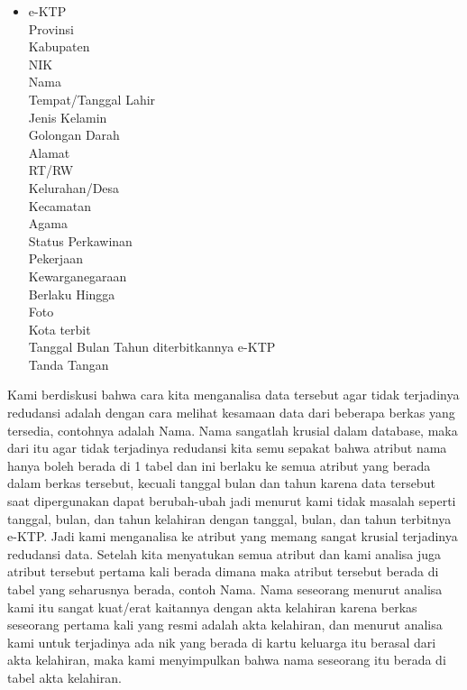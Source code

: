 \begin{itemize}
	\item e-KTP\\
		Provinsi\\
		Kabupaten\\
		NIK\\
		Nama\\
		Tempat/Tanggal Lahir\\
		Jenis Kelamin\\
		Golongan Darah\\
		Alamat\\
		RT/RW\\
		Kelurahan/Desa\\
		Kecamatan\\
		Agama\\
		Status Perkawinan\\
		Pekerjaan\\
		Kewarganegaraan\\
		Berlaku Hingga\\
		Foto\\
		Kota terbit\\
		Tanggal Bulan Tahun diterbitkannya e-KTP\\
		Tanda Tangan\\

\end{itemize}

Kami berdiskusi bahwa cara kita menganalisa data tersebut agar tidak terjadinya redudansi adalah dengan cara melihat kesamaan data dari beberapa berkas yang tersedia, contohnya adalah Nama. Nama sangatlah krusial dalam database, maka dari itu agar tidak terjadinya redudansi kita semu sepakat bahwa atribut nama hanya boleh berada di 1 tabel dan ini berlaku ke semua atribut yang berada dalam berkas tersebut, kecuali tanggal bulan dan tahun karena data tersebut saat dipergunakan dapat berubah-ubah jadi menurut kami tidak masalah seperti tanggal, bulan, dan tahun kelahiran dengan tanggal, bulan, dan tahun terbitnya e-KTP. Jadi kami menganalisa ke atribut yang memang sangat krusial terjadinya redudansi data. Setelah kita menyatukan semua atribut dan kami analisa juga atribut tersebut pertama kali berada dimana maka atribut tersebut berada di tabel yang seharusnya berada, contoh Nama. Nama seseorang menurut analisa kami itu sangat kuat/erat kaitannya dengan akta kelahiran karena berkas seseorang pertama kali yang resmi adalah akta kelahiran, dan menurut analisa kami untuk terjadinya ada nik yang berada di kartu keluarga itu berasal dari akta kelahiran, maka kami menyimpulkan bahwa nama seseorang itu berada di tabel akta kelahiran.

